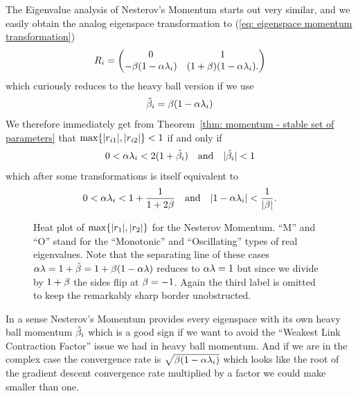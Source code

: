 The Eigenvalue analysis of Nesterov's Momentum starts out very similar, and we
easily obtain the analog eigenspace transformation to (\ref{eq: eigenspace
momentum transformation})
%
\begin{align*}
	R_i = \begin{pmatrix}
		0 & 1\\
		-\beta(1-\alpha\lambda_i) & (1+\beta)(1-\alpha\lambda_i).
	\end{pmatrix}	
\end{align*}
%
which curiously reduces to the heavy ball version if we use
\begin{align}\label{eq: tilde momentum}
	\tilde{\beta}_i = \beta(1-\alpha\lambda_i)
\end{align}
We therefore immediately get from Theorem~\ref{thm: momentum - stable set of
parameters} that \(\max\{|r_{i1}|,|r_{i2}|\}<1\) if and only if
\begin{align*}
	0<\alpha\lambda_i < 2(1+\tilde{\beta}_i)
	\quad \text{and} \quad
	|\tilde{\beta}_i|<1
\end{align*}
%
which after some transformations is itself equivalent to
\begin{align*}
	0<\alpha\lambda_i < 1+\frac{1}{1+2\beta}
	\quad \text{and} \quad
	|1-\alpha\lambda_i|<\frac{1}{|\beta|}.
\end{align*}
%
\begin{figure}[h]
	\centering
	\def\svgwidth{1\textwidth}
	
	\caption{
		Heat plot of \(\max\{|r_1|,|r_2|\}\) for the Nesterov Momentum.
		``M'' and ``O'' stand for the ``Monotonic'' and ``Oscillating'' types of 
		real eigenvalues. Note that the separating line of these cases
		\(\alpha\lambda=1+\tilde{\beta}=1+\beta(1-\alpha\lambda)\)
		reduces to \(\alpha\lambda=1\) but since we divide by \(1+\beta\)
		the sides flip at \(\beta=-1\). Again the third label is omitted to
		keep the remarkably sharp border unobstructed.
	}
	\label{fig: annotated nesterov rates}
\end{figure}

In a sense Nesterov's Momentum provides every eigenspace with its own
heavy ball momentum \(\tilde{\beta}_i\) which is a good sign if we want
to avoid the ``Weakest Link Contraction Factor'' issue we had in heavy ball
momentum. And if we are in the complex case the convergence rate is
\(\sqrt{\beta(1-\alpha\lambda_i)}\) which looks like the root of the
gradient descent convergence rate multiplied by a factor we could make smaller
than one.

